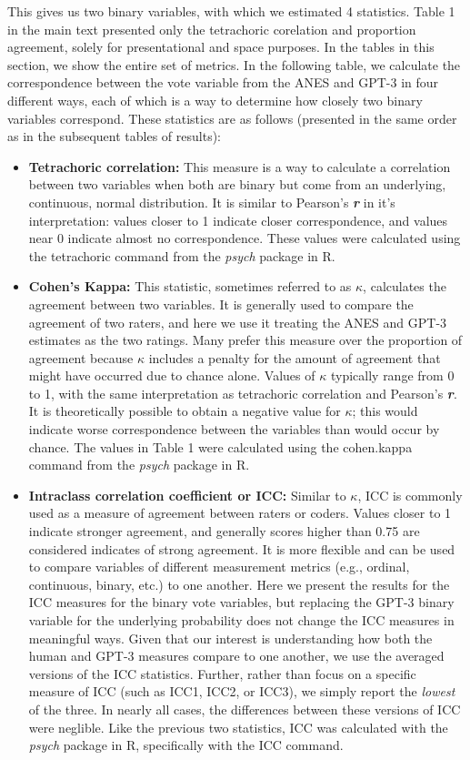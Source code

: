 \documentclass[11pt]{article}
\begin{document}
This gives us two binary variables, with which we estimated 4 statistics. Table 1 in the main text presented only the tetrachoric corelation and proportion agreement, solely for presentational and space purposes. In the tables in this section, we show the entire set of metrics. In the following table, we calculate the correspondence between the vote variable from the ANES and GPT-3 in four different ways, each of which is a way to determine how closely two binary variables correspond. These statistics are as follows (presented in the same order as in the subsequent tables of results):
\begin{itemize}
  \item \textbf{Tetrachoric correlation:} This measure is a way to calculate a correlation between two variables when both are binary but come from an underlying, continuous, normal distribution. It is similar to Pearson's \textbf{\emph{r}} in it's interpretation: values closer to 1 indicate closer correspondence, and values near 0 indicate almost no correspondence. These values were calculated using the tetrachoric command from the \textit{psych} package in R.
  \item \textbf{Cohen's Kappa:} This statistic, sometimes referred to as $\kappa$, calculates the agreement between two variables. It is generally used to compare the agreement of two raters, and here we use it treating the ANES and GPT-3 estimates as the two ratings. Many prefer this measure over the proportion of agreement because $\kappa$ includes a penalty for the amount of agreement that might have occurred due to chance alone. Values of $\kappa$ typically range from 0 to 1, with the same interpretation as tetrachoric correlation and Pearson's \textbf{\emph{r}}. It is theoretically possible to obtain a negative value for $\kappa$; this would indicate worse correspondence between the variables than would occur by chance. The values in Table 1 were calculated using the cohen.kappa command from the \textit{psych} package in R.
  \item \textbf{Intraclass correlation coefficient  or ICC:} Similar to $\kappa$, ICC is commonly used as a measure of agreement between raters or coders. Values closer to 1 indicate stronger agreement, and generally scores higher than 0.75 are considered indicates of strong agreement. It is more flexible and can be used to compare variables of different measurement metrics (e.g., ordinal, continuous, binary, etc.) to one another. Here we present the results for the ICC measures for the binary vote variables, but replacing the GPT-3 binary variable for the underlying probability does not change the ICC measures in meaningful ways. Given that our interest is understanding how both the human and GPT-3 measures compare to one another, we use the averaged versions of the ICC statistics. Further, rather than focus on a specific measure of ICC (such as ICC1, ICC2, or ICC3), we simply report the \textit{lowest} of the three. In nearly all cases, the differences between these versions of ICC were neglible. Like the previous two statistics, ICC was calculated with the \textit{psych} package in R, specifically with the  ICC command.

\end{itemize}
\end{document}
